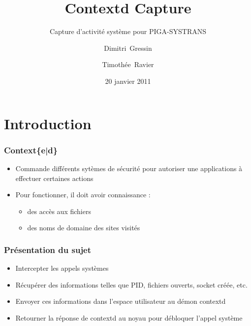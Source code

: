 \documentclass{beamer}
\title{Contextd Capture}
\subtitle{Capture d'activité système pour PIGA-SYSTRANS}
\author{Dimitri~Gressin \and Timothée~Ravier}
\institute{ENSI de Bourges}
\date{20 janvier 2011}
\begin{document}
{
	\framenumberoff
	\watermarkoff
	\begin{frame}
	\titlepage
	\end{frame}
}

\section{Introduction}
\begin{frame}
\frametitle{Context\{e|d\}}
\begin{itemize}
	\item Commande différents sytèmes de sécurité pour autoriser une applications à effectuer certaines actions
	\item Pour fonctionner, il doit avoir connaissance :
		\begin{itemize}
			\item des accès aux fichiers
			\item des noms de domaine des sites visités
		\end{itemize}
\end{itemize}
\end{frame}

\begin{frame}
\frametitle{Présentation du sujet}
\begin{itemize}
	\item Intercepter les appels systèmes
	\item Récupérer des informations telles que PID, fichiers ouverts, socket créée, etc.
	\item Envoyer ces informations dans l'espace utilisateur au démon contextd
	\item Retourner la réponse de contextd au noyau pour débloquer l'appel système
\end{itemize}
\end{frame}
\end{document}
